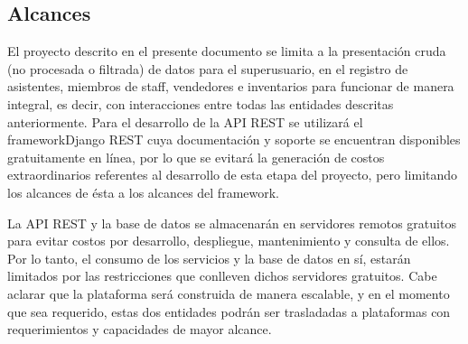 \subsection*{Alcances}

El proyecto descrito en el presente documento se limita a la presentación cruda (no procesada o filtrada) de datos para el superusuario, en el registro de asistentes, miembros de staff, vendedores e inventarios para funcionar de manera integral, es decir, con interacciones entre todas las entidades descritas anteriormente.
Para el desarrollo de la API REST se utilizará el frameworkDjango REST cuya documentación y soporte se encuentran disponibles gratuitamente en línea, por lo que se evitará la generación de costos extraordinarios referentes al desarrollo de esta etapa del proyecto, pero limitando los alcances de ésta a los alcances del framework.

La API REST y la base de datos se almacenarán en servidores remotos gratuitos para evitar costos por desarrollo, despliegue, mantenimiento y consulta de ellos. Por lo tanto, el consumo de los servicios y la base de datos en sí, estarán limitados por las restricciones que conlleven dichos servidores gratuitos. Cabe aclarar que la plataforma será construida de manera escalable, y en el momento que sea requerido, estas dos entidades podrán ser trasladadas a plataformas con requerimientos y capacidades de mayor alcance.
